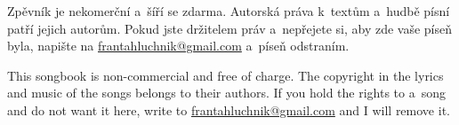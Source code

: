 \begin{otherlanguage}{czech}
\noindent Zpěvník je nekomerční a~šíří se zdarma. Autorská práva k~textům a~hudbě písní patří jejich autorům. Pokud jste držitelem práv a~nepřejete si, aby zde vaše píseň byla, napište na \href{mailto:frantahluchnik@gmail.com}{frantahluchnik@gmail.com} a~píseň odstraním.
\end{otherlanguage}

\vspace{3mm}
\begin{otherlanguage}{british}
\noindent This songbook is non-commercial and free of charge. The copyright in the lyrics and music of the songs belongs to their authors. If you hold the rights to a~song and do not want it here, write to \href{mailto:frantahluchnik@gmail.com}{frantahluchnik@gmail.com} and I will remove it.
\end{otherlanguage}
